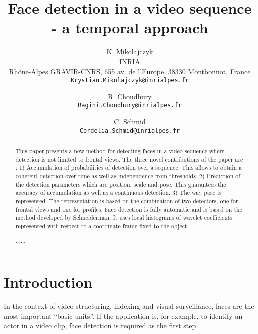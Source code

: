 \documentclass[10pt,twocolumn,letterpaper]{article}
\begin{document}
\title{Face detection in a video sequence - a temporal approach}

\author{K. Mikolajczyk\\
INRIA\\
Rh\^{o}ne-Alpes GRAVIR-CNRS, 655 av. de l’Europe, 38330 Montbonnot, France\\
{\tt\small Krystian.Mikolajczyk@inrialpes.fr}
\and
R. Choudhury\\
{\tt\small Ragini.Choudhury@inrialpes.fr}
\and
C. Schmid\\
{\tt\small Cordelia.Schmid@inrialpes.fr}
}

\maketitle

\begin{abstract}
This paper presents a new method for detecting faces in
a video sequence where detection is not limited to frontal
views. The three novel contributions of the paper are :
1) Accumulation of probabilities of detection over a sequence. This allows to obtain a coherent detection over
time as well as independence from thresholds. 2) Prediction of the detection parameters which are position, scale
and pose. This guarantees the accuracy of accumulation as
well as a continuous detection. 3) The way pose is represented. The representation is based on the combination of
two detectors, one for frontal views and one for profiles.
Face detection is fully automatic and is based on the
method developed by Schneiderman. It uses local histograms of wavelet coefficients represented with respect to
a coordinate frame fixed to the object.

......
\end{abstract}

\section{Introduction}

In the context of video structuring, indexing and visual
surveillance, faces are the most important “basic units”. If
the application is, for example, to identify an actor in a
video clip, face detection is required as the first step.
\end{document}
